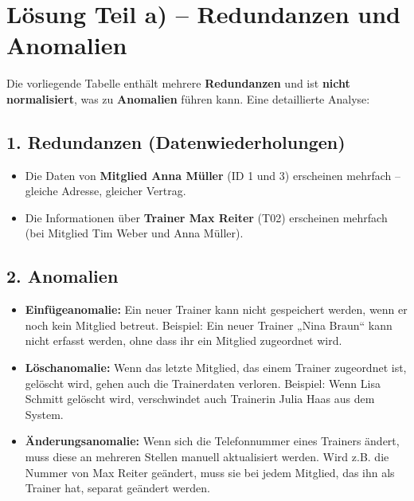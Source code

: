 \documentclass{article}
\begin{document}
	
	\section*{Lösung Teil a) – Redundanzen und Anomalien}
	
	Die vorliegende Tabelle enthält mehrere \textbf{Redundanzen} und ist \textbf{nicht normalisiert}, was zu \textbf{Anomalien} führen kann. Eine detaillierte Analyse:
	
	\subsection*{1. Redundanzen (Datenwiederholungen)}
	\begin{itemize}
		\item Die Daten von \textbf{Mitglied Anna Müller} (ID 1 und 3) erscheinen mehrfach – gleiche Adresse, gleicher Vertrag.
		\item Die Informationen über \textbf{Trainer Max Reiter} (T02) erscheinen mehrfach (bei Mitglied Tim Weber und Anna Müller).
	\end{itemize}
	
	\subsection*{2. Anomalien}
	\begin{itemize}
		\item \textbf{Einfügeanomalie:} Ein neuer Trainer kann nicht gespeichert werden, wenn er noch kein Mitglied betreut. Beispiel: Ein neuer Trainer „Nina Braun“ kann nicht erfasst werden, ohne dass ihr ein Mitglied zugeordnet wird.
		
		\item \textbf{Löschanomalie:} Wenn das letzte Mitglied, das einem Trainer zugeordnet ist, gelöscht wird, gehen auch die Trainerdaten verloren. Beispiel: Wenn Lisa Schmitt gelöscht wird, verschwindet auch Trainerin Julia Haas aus dem System.
		
		\item \textbf{Änderungsanomalie:} Wenn sich die Telefonnummer eines Trainers ändert, muss diese an mehreren Stellen manuell aktualisiert werden. Wird z.B. die Nummer von Max Reiter geändert, muss sie bei jedem Mitglied, das ihn als Trainer hat, separat geändert werden.
	\end{itemize}
	
\end{document}
